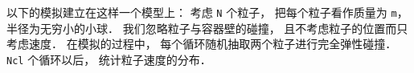 
以下的模拟建立在这样一个模型上： 考虑 \lstinline|N| 个粒子， 把每个粒子看作质量为 \lstinline|m|， 半径为无穷小的小球． 我们忽略粒子与容器壁的碰撞， 且不考虑粒子的位置而只考虑速度． 在模拟的过程中， 每个循环随机抽取两个粒子进行完全弹性碰撞． \lstinline|Ncl| 个循环以后， 统计粒子速度的分布．
